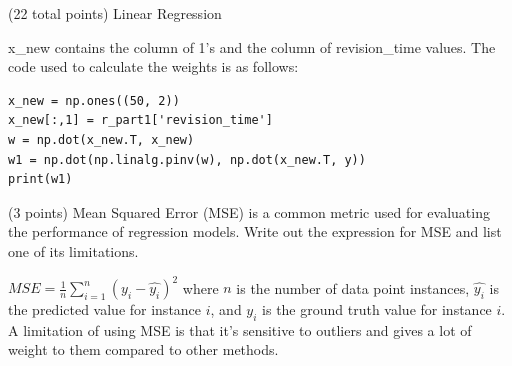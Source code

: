 \documentclass[12pt]{article}
\begin{document}
\begin{question}{(22 total points) Linear Regression}
\begin{subquestion}
\begin{answerbox}{20em}
x\_new contains the column of 1's and the column of revision\_time values. The code used to calculate the weights is as follows:
\begin {verbatim}
x_new = np.ones((50, 2))
x_new[:,1] = r_part1['revision_time']
w = np.dot(x_new.T, x_new)
w1 = np.dot(np.linalg.pinv(w), np.dot(x_new.T, y))
print(w1)
\end {verbatim}
\end{answerbox}



\end{subquestion}



%
%
\begin{subquestion}{(3 points) Mean Squared Error (MSE) is a common metric used for evaluating the performance of regression models. 
Write out the expression for MSE and list one of its limitations. \\
}


\begin{answerbox}{10em}
$MSE = \frac{1}{n}\sum\limits_{i=1}^n(y_i-\hat{y_i})^2$ where $n$ is the number of data point instances, $\hat{y_i}$ is the predicted value for instance $i$, and $y_i$ is the ground truth value for instance $i$.
A limitation of using MSE is that it's sensitive to outliers and gives a lot of weight to them compared to other methods.
\end{answerbox}



\end{subquestion}


 
%
%
\end{question}
\end{document}
